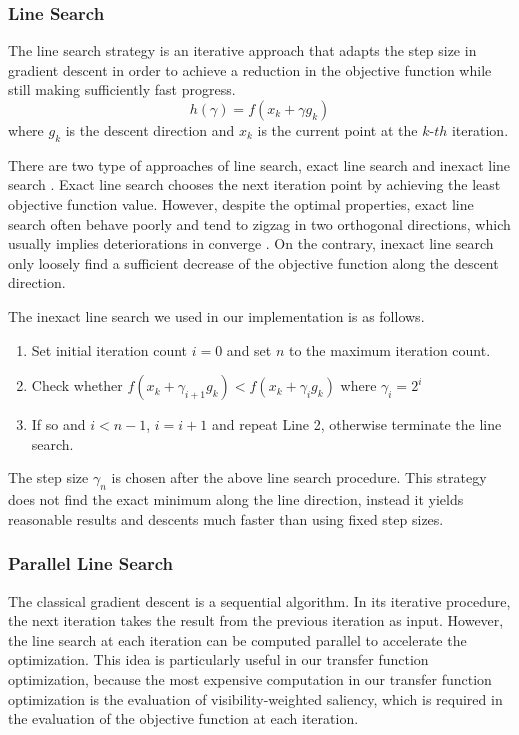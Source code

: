 \subsubsection{Line Search}
The line search strategy is an iterative approach that adapts the step size in gradient descent in order to achieve a reduction in the objective function while still making sufficiently fast progress.
\[ h( \gamma)=f(x_{k}+\gamma g_{k}) \]
where $ g_{k} $ is the descent direction and $ x_{k} $ is the current point at the $ k$-$th $ iteration.

There are two type of approaches of line search, exact line search and inexact line search \cite{vrahatis_class_2000}.
Exact line search chooses the next iteration point by achieving the least objective function value. However, despite the optimal properties, exact line search often behave poorly and tend to zigzag in two orthogonal directions, which usually implies deteriorations in converge \cite{zhou_gradient_2006}.
On the contrary, inexact line search only loosely find a sufficient decrease of the objective function along the descent direction.

The inexact line search we used in our implementation is as follows.

\begin{enumerate}
	\item Set initial iteration count $ i=0 $ and set $ n $ to the maximum iteration count.
	\item Check whether $ f(x_{k}+\gamma_{i+1} g_{k}) < f(x_{k}+\gamma_{i} g_{k}) $ where $ \gamma_{i}=2^{i} $
	\item If so and $ i<n-1 $, $ i=i+1 $ and repeat Line 2, otherwise terminate the line search.
\end{enumerate}

The step size $ \gamma_{n} $ is chosen after the above line search procedure.
This strategy does not find the exact minimum along the line direction, instead it yields reasonable results and descents much faster than using fixed step sizes.

\subsubsection{Parallel Line Search}
The classical gradient descent is a sequential algorithm. In its iterative procedure, the next iteration takes the result from the previous iteration as input.
However, the line search at each iteration can be computed parallel to accelerate the optimization. This idea is particularly useful in our transfer function optimization, because the most expensive computation in our transfer function optimization is the evaluation of visibility-weighted saliency, which is required in the evaluation of the objective function at each iteration.


